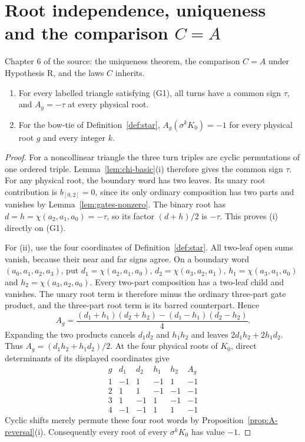 \chapter{Root independence, uniqueness and the comparison $C=A$}
Chapter 6 of the source: the uniqueness theorem, the comparison $C=A$ under Hypothesis R, and the laws $C$ inherits.

\begin{lemma}\label{lem:A-small-values}\leanok
\begin{enumerate}
\item[(i)] For every labelled triangle satisfying (G1), all turns
have a common sign $\tau$, and $A_g=-\tau$ at every physical root.
\item[(ii)] For the bow-tie of Definition~\ref{def:star},
$A_g(\sigma^kK_0)=-1$ for every physical root $g$ and every integer $k$.
\end{enumerate}

\end{lemma}
\begin{proof}\leanok{}
For a noncollinear triangle the three turn triples are cyclic
permutations of one ordered triple. Lemma~\ref{lem:chi-basic}(i)
therefore gives the common sign $\tau$. For any physical root,
the boundary word has two leaves. Its unary root contribution is
$b_{[0,2]}=0$, since its only ordinary composition has two parts
and vanishes by Lemma~\ref{lem:gates-nonzero}. The binary root
has $d=h=\chi(a_2,a_1,a_0)=-\tau$, so its factor
$(d+h)/2$ is $-\tau$. This proves (i) directly on (G1).

For (ii), use the four coordinates of Definition~\ref{def:star}.
All two-leaf open sums vanish, because their near
and far signs agree. On a boundary word $(a_0,a_1,a_2,a_3)$, put
$d_1=\chi(a_2,a_1,a_0)$, $d_2=\chi(a_3,a_2,a_1)$,
$h_1=\chi(a_3,a_1,a_0)$ and $h_2=\chi(a_3,a_2,a_0)$.
Every two-part composition has a two-leaf child and vanishes.
The unary root term is therefore minus the ordinary three-part gate
product, and the three-part root term is its barred counterpart. Hence
\begin{equation}\label{eq:root-bowtie-recursion}
A_g=\frac{(d_1+h_1)(d_2+h_2)-(d_1-h_1)(d_2-h_2)}4.
\end{equation}
Expanding the two products cancels $d_1d_2$ and $h_1h_2$ and leaves
$2d_1h_2+2h_1d_2$. Thus $A_g=(d_1h_2+h_1d_2)/2$.
At the four physical roots of $K_0$, direct determinants of its displayed
coordinates give
\begin{equation}\label{eq:root-bowtie-signs}
\begin{array}{c|rrrr|r}
g&d_1&d_2&h_1&h_2&A_g\\\hline
1&-1&1&-1&1&-1\\
2&1&1&-1&-1&-1\\
3&1&-1&1&-1&-1\\
4&-1&-1&1&1&-1
\end{array}
\end{equation}
Cyclic shifts merely permute these four root words by
Proposition~\ref{prop:A-reversal}(i). Consequently every root of every
$\sigma^kK_0$ has value $-1$.
\end{proof}

